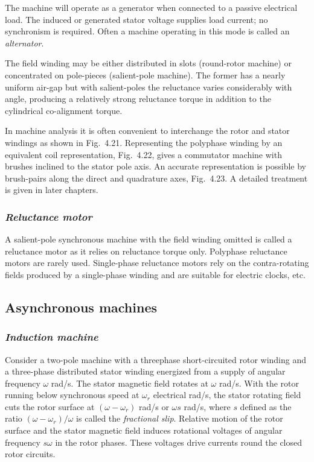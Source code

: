 \documentclass[a4paper,numbers=noenddot,12pt]{scrbook}
\begin{document}
The machine will operate as a generator when connected to a passive electrical load. The induced or generated stator voltage supplies load current; no synchronism is required. Often a machine operating in this mode is called an \textit{alternator}.

The field winding may be either distributed in slots (round-rotor machine) or concentrated on pole-pieces (salient-pole machine). The former has a nearly uniform air-gap but with salient-poles the reluctance varies considerably with angle, producing a relatively strong reluctance torque in addition to the cylindrical co-alignment torque.

In machine analysis it is often convenient to interchange the rotor and stator windings as shown in Fig.\ 4.21. Representing the poly­phase winding by an equivalent coil representation, Fig.\ 4.22, gives a commutator machine with brushes inclined to the stator pole axis. An accurate representation is possible by brush-pairs along the direct and quadrature axes, Fig.\ 4.23. A detailed treatment is given in later chapters.  

\subsubsection{\textit{Reluctance motor}}
A salient-pole synchronous machine with the field winding omitted is called a reluctance motor as it relies on reluctance torque only. Polyphase reluctance motors are rarely used. Single-phase reluctance motors rely on the contra-rotating fields produced by a single-phase winding and are suitable for electric clocks, etc.

\subsection{Asynchronous machines}
\subsubsection{\textit{Induction machine}}
Consider a two-pole machine with a three­phase short-circuited rotor winding and a three-phase distributed stator winding energized from a supply of angular frequency $\omega$ rad/s. The stator magnetic field rotates at $\omega$ rad/s. With the rotor running below synchronous speed at $\omega_r$ electrical rad/s, the stator rotating field cuts the rotor surface at $(\omega - \omega_r)$ rad/s or $\omega s$ rad/s, where $s$ defined as the ratio
$(\omega - \omega_r)/\omega$ is called the \textit{fractional slip}. Relative motion of the rotor surface and the stator magnetic field induces rotational voltages of angular frequency $s \omega$ in the rotor phases. These voltages drive currents round the closed rotor circuits.
\end{document}
